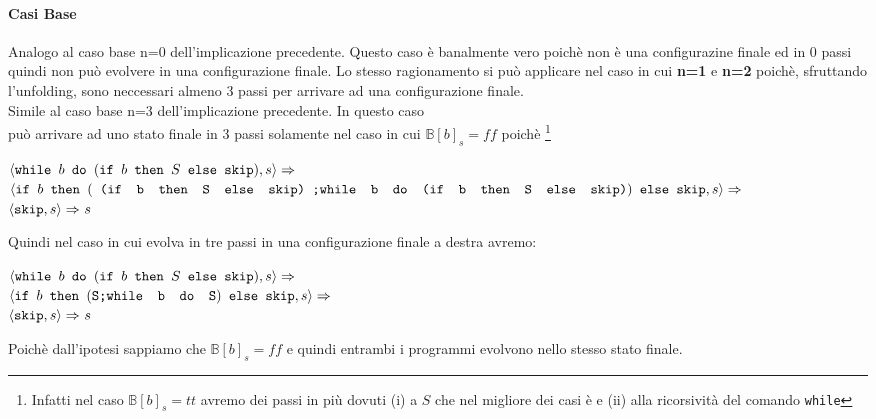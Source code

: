 {    \paragraph{Casi Base}
    
    
	 Analogo al caso base n=0 dell'implicazione precedente. Questo
	caso è banalmente vero poichè \exFourRS{} non è una configurazine finale ed
	in 0 passi quindi non può evolvere in una configurazione finale. Lo stesso
	ragionamento si può applicare nel caso in cui \textbf{n=1} e \textbf{n=2}
	poichè, sfruttando l'unfolding, sono neccessari almeno 3 passi per arrivare
	ad una configurazione finale.\\

	 Simile al caso base n=3 dell'implicazione precedente. In
	questo caso \\ \exFourRS{} può arrivare ad uno stato finale
	in 3 passi solamente nel caso in cui $\mathbb{B}[b]_s=ff$ poichè
	\footnote{Infatti nel caso $\mathbb{B}[b]_s=tt$ avremo dei passi in più 
	dovuti (i) a $S$ che nel migliore dei casi è \skipistr{} e (ii) alla
	ricorsività del comando \texttt{while}}
	
	\begin{center}
	$\exFourRS\Rar{}$\\
	{\small
	$\confSs{
		\ifABC{b}
			{(\concat{
				(\ifABC{b}{S}{\skipistr})
			}{\wbS{b}{(\ifABC{b}{S}{\skipistr})}{}})}
			{\skipistr}
	}{s}\Rar{}$}\\
	$\confSs{\skipistr}{s}\Rar{}s $
	\end{center}

	Quindi nel caso in cui \exFourRS{} evolva in tre passi in una
	configurazione finale a destra avremo:
	\begin{center}
	$\confSs{\wbS{b}{(\ifABC{b}{S}{\skipistr})}}{s}\Rar{}$\\
	$\confSs{
		\ifABC{b}{(\concat{S}{\wbS{b}{S}})}{\skipistr}
	}{s}\Rar{}$\\
	$\confSs{\skipistr}{s}\Rar{}s$
	\end{center}
	Poichè dall'ipotesi sappiamo che $\mathbb{B}[b]_s=ff$ e quindi entrambi i programmi evolvono nello stesso stato finale.\\
}
